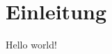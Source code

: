\documentclass[title-style=modern,print-ndn=false,auto-generate=false,bib-file=content/literature.bib]{udhbwvst}
\begin{document}
\dhbwSetFrontMatter

\dhbwPrintTitle
\dhbwPrintNonDisclosureNotice
\dhbwPrintTableOfContents

\dhbwSetListMatter

\dhbwPrintListOfAcronyms
\dhbwPrintListOfFigures
\dhbwPrintListOfTables
\dhbwPrintListOfListings

\dhbwSetMainMatter

\section{Einleitung}

Hello world!

\dhbwPrintBibliography
\end{document}
